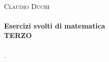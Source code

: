\frontmatter
\begin{titlepage}
	\begin{center}
		\\[1cm]       
		\textsc{\LARGE Claudio Duchi}\\[1.5cm]
		\HRule \\[0.4cm]
		{\huge \bfseries Esercizi svolti di matematica}\\[0.4cm]
		{\bfseries TERZO}\\[0.4cm]
		\HRule \\[1.5cm]
		\vfill
		{\large \DTMnow.}
	\end{center}
\end{titlepage}
\setcounter{page}{2}

\tableofcontents 
{}
\listoffigures
\cleardoublepage\renewcommand{}
\lstlistoflistings{}
\mainmatter%


\printindex

